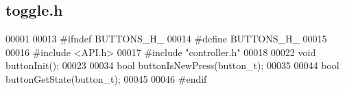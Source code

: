 \subsection{toggle.\+h}
\label{toggle_8h_source}

\begin{DoxyCode}
00001 
00013 \textcolor{preprocessor}{#ifndef BUTTONS\_H\_}
00014 \textcolor{preprocessor}{#define BUTTONS\_H\_}
00015 
00016 \textcolor{preprocessor}{#include <API.h>}
00017 \textcolor{preprocessor}{#include "controller.h"}
00018 
00022 \textcolor{keywordtype}{void} buttonInit();
00023 
00034 \textcolor{keywordtype}{bool} buttonIsNewPress(button_t);
00035 
00044 \textcolor{keywordtype}{bool} buttonGetState(button_t);
00045 
00046 \textcolor{preprocessor}{#endif}
\end{DoxyCode}
